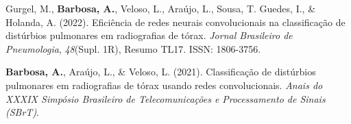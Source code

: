 \begin{list}{}{%
  \setlength{\leftmargin}{2.5em}%
  \setlength{\labelwidth}{2.5em}%
  \setlength{\labelsep}{0pt}%
  \setlength{\itemsep}{1.5ex}%
  \setlength{\parsep}{0pt}%
}
\cvdivider

\item[{\makebox[2.5em][l]{\circled{5}}}]
Gurgel, M.,
\textbf{Barbosa, A.},
Veloso, L., Araújo, L.,
Sousa, T.  Guedes, I.,
\& Holanda, A. (2022).
Eficiência de redes neurais convolucionais
na classificação de distúrbios pulmonares
em radiografias de tórax.
\emph{Jornal Brasileiro de Pneumologia},
\emph{48}(Supl. 1R), Resumo TL17. ISSN: 1806-3756.

\cvdivider

\item[{\makebox[2.5em][l]{\circled{6}}}]
\textbf{Barbosa, A.}, Araújo, L.,
\& Veloso, L. (2021).
Classificação de distúrbios pulmonares
em radiografias de tórax usando redes convolucionais.
\emph{Anais do XXXIX Simpósio Brasileiro
de Telecomunicações e Processamento de Sinais
(SBrT)}.

\end{list}
